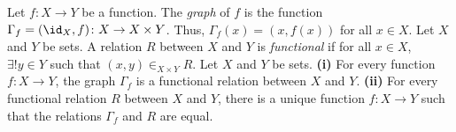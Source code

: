 Let $f \colon X \to Y$ be a function. The \textit{graph} of $f$ is the function $\Gamma_f = (\id_X, f) \colon X \to X \times Y$. Thus, $\Gamma_f(x) = (x, f(x))$ for all $x \in X$.
 Let $X$ and $Y$ be sets. A relation $R$ between $X$ and $Y$ is \textit{functional} if for all $x \in X$, $\exists! y \in Y$ such that $(x, y) \in_{X \times Y} R$.
 Let $X$ and $Y$ be sets. \textbf{(i)} For every function $f \colon X \to Y$, the graph $\Gamma_f$ is a functional relation between $X$ and $Y$. \textbf{(ii)} For every functional relation $R$ between $X$ and $Y$, there is a unique function $f \colon X \to Y$ such that the relations $\Gamma_f$ and $R$ are equal.
